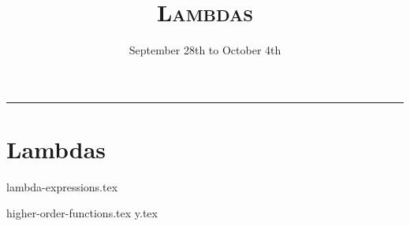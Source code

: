 \documentclass{exam}
\title{\textsc{Lambdas}}
\date{September 28th to October 4th}
\begin{document}
\maketitle
\rule{\textwidth}{0.15em}
\fontsize{12}{15}\selectfont


\section{Lambdas}
{lambda-expressions.tex}
\newpage
\begin{questions}
{higher-order-functions.tex}
\newpage
\newpage
{y.tex}
\end{questions}
\newpage
\end{document}
